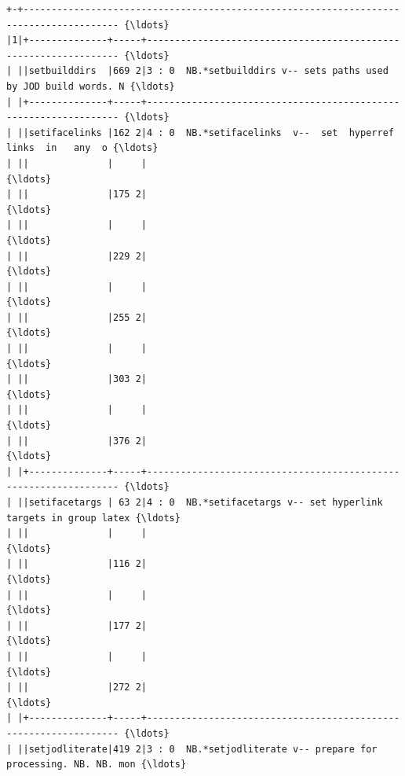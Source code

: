 \documentclass[11pt,letter,landscape]{article}
\begin{document}
    \begin{Verbatim}[commandchars=\\\{\}]
+-+--------------------------------------------------------------------------------------- {\ldots} 
|1|+--------------+-----+----------------------------------------------------------------- {\ldots} 
| ||setbuilddirs  |669 2|3 : 0  NB.*setbuilddirs v-- sets paths used by JOD build words. N {\ldots} 
| |+--------------+-----+----------------------------------------------------------------- {\ldots} 
| ||setifacelinks |162 2|4 : 0  NB.*setifacelinks  v--  set  hyperref   links  in   any  o {\ldots} 
| ||              |     |                                                                  {\ldots} 
| ||              |175 2|                                                                  {\ldots} 
| ||              |     |                                                                  {\ldots} 
| ||              |229 2|                                                                  {\ldots} 
| ||              |     |                                                                  {\ldots} 
| ||              |255 2|                                                                  {\ldots} 
| ||              |     |                                                                  {\ldots} 
| ||              |303 2|                                                                  {\ldots} 
| ||              |     |                                                                  {\ldots} 
| ||              |376 2|                                                                  {\ldots} 
| |+--------------+-----+----------------------------------------------------------------- {\ldots} 
| ||setifacetargs | 63 2|4 : 0  NB.*setifacetargs v-- set hyperlink targets in group latex {\ldots} 
| ||              |     |                                                                  {\ldots} 
| ||              |116 2|                                                                  {\ldots} 
| ||              |     |                                                                  {\ldots} 
| ||              |177 2|                                                                  {\ldots} 
| ||              |     |                                                                  {\ldots} 
| ||              |272 2|                                                                  {\ldots} 
| |+--------------+-----+----------------------------------------------------------------- {\ldots} 
| ||setjodliterate|419 2|3 : 0  NB.*setjodliterate v-- prepare for processing. NB. NB. mon {\ldots} 

\end{Verbatim}
\end{document}

